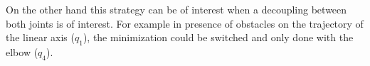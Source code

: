 On the other hand this strategy can be of interest when a decoupling between both joints is of interest. For example in presence of obstacles on the trajectory of the linear axis ($q_1$), the minimization could be switched and only done with the elbow ($q_4$).












